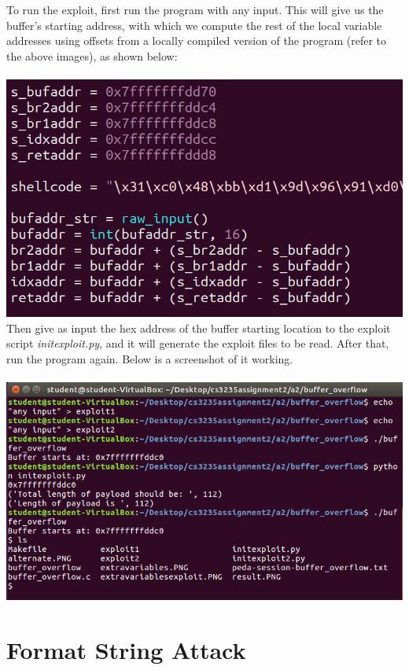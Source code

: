 \documentclass[12pt]{article}
\begin{document}
To run the exploit, first run the program with any input. This will give us the buffer's starting address, with which we compute the rest of the local variable addresses using offsets from a locally compiled version of the program (refer to the above images), as shown below:\\\\
\includegraphics[scale=0.7]{./a2/buffer_overflow/offset.PNG}\\

Then give as input the hex address of the buffer starting location to the exploit script \emph{initexploit.py}, and it will generate the exploit files to be read. After that, run the program again. Below is a screenshot of it working.\\\\
\includegraphics[scale=1]{./a2/buffer_overflow/result.PNG}


\newpage
\section{Format String Attack}
\end{document}
